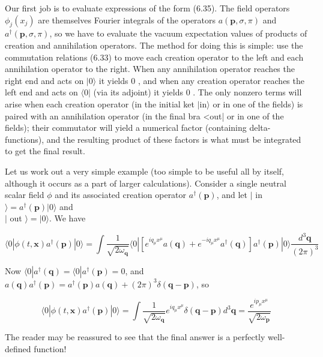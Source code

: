 \documentclass[10pt, letterpaper]{article}
\begin{document}
Our first job is to evaluate expressions of the form (6.35). The field operators $\phi_{j}\left(x_{j}\right)$ are themselves Fourier integrals of the operators $a(\mathbf{p}, \sigma, \pi)$ and $a^{\dagger}(\mathbf{p}, \sigma, \pi)$, so we have to evaluate the vacuum expectation values of products of creation and annihilation operators. The method for doing this is simple: use the commutation relations (6.33) to move each creation operator to the left and each annihilation operator to the right. When any annihilation operator reaches the right end and acts on $|0\rangle$ it yields 0 , and when any creation operator reaches the left end and acts on $\langle 0|$ (via its adjoint) it yields 0 . The only nonzero terms will arise when each creation operator (in the initial ket $|\mathrm{in}\rangle$ or in one of the fields) is paired with an annihilation operator (in the final bra <out| or in one of the fields); their commutator will yield a numerical factor (containing delta-functions), and the resulting product of these factors is what must be integrated to get the final result.

Let us work out a very simple example (too simple to be useful all by itself, although it occurs as a part of larger calculations). Consider a single neutral scalar field $\phi$ and its associated creation operator $a^{\dagger}(\mathbf{p})$, and let $\mid$ in $\rangle=a^{\dagger}(\mathbf{p})|0\rangle$ and\\
$\mid$ out $\rangle=|0\rangle$. We have

$$
\langle 0| \phi(t, \mathbf{x}) a^{\dagger}(\mathbf{p})|0\rangle=\int \frac{1}{\sqrt{2 \omega_{\mathbf{q}}}}\langle 0|\left[e^{i q_{\mu} x^{\mu}} a(\mathbf{q})+e^{-i q_{\mu} x^{\mu}} a^{\dagger}(\mathbf{q})\right] a^{\dagger}(\mathbf{p})|0\rangle \frac{d^{3} \mathbf{q}}{(2 \pi)^{3}}
$$

Now $\langle 0| a^{\dagger}(\mathbf{q})=\langle 0| a^{\dagger}(\mathbf{p})=0$, and $a(\mathbf{q}) a^{\dagger}(\mathbf{p})=a^{\dagger}(\mathbf{p}) a(\mathbf{q})+(2 \pi)^{3} \delta(\mathbf{q}-\mathbf{p})$, so

$$
\langle 0| \phi(t, \mathbf{x}) a^{\dagger}(\mathbf{p})|0\rangle=\int \frac{1}{\sqrt{2 \omega_{\mathbf{q}}}} e^{i q_{\mu} x^{\mu}} \delta(\mathbf{q}-\mathbf{p}) d^{3} \mathbf{q}=\frac{e^{i p_{\mu} x^{\mu}}}{\sqrt{2 \omega_{\mathbf{p}}}}
$$

The reader may be reassured to see that the final answer is a perfectly well-defined function!
\end{document}
